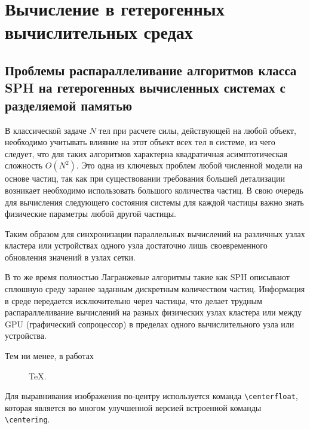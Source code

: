 \chapter{Вычисление в гетерогенных вычислительных средах}\label{ch:ch2}

\section{Проблемы распараллеливание алгоритмов класса SPH на гетерогенных вычисленных системах с разделяемой памятью}\label{sec:ch2/sec1}

В классической задаче \(N\) тел при расчете силы, действующей на любой объект, необходимо учитывать влияние на этот объект всех тел в системе, из чего следует, что для таких алгоритмов характерна квадратичная асимптотическая сложность \(O(N^2)\). Это одна из ключевых проблем любой численной модели на основе частиц, так как при существовании требования большей детализации возникает необходимо использовать большого количества частиц. В свою очередь для вычисления следующего состояния системы для каждой частицы важно знать физические параметры любой другой частицы. 

 Таким образом для синхронизации параллельных вычислений на различных узлах кластера или устройствах одного узла достаточно лишь своевременного обновления значений в узлах сетки.

В то же время полностью Лагранжевые алгоритмы такие как SPH описывают сплошную среду заранее заданным дискретным количеством частиц. Информация в среде передается исключительно через частицы, что делает трудным распараллеливание вычислений на разных физических узлах кластера или между GPU (графический сопроцессор) в пределах одного вычислительного узла или устройства.

Тем ни менее, в работах \cite {Dominguez2013, Verma2017, Verma2018}
 
\begin{figure}[ht]
  \caption{TeX.}\label{fig:latex}
\end{figure}

Для выравнивания изображения по-центру используется команда \verb+\centerfloat+, которая является во
многом улучшенной версией встроенной команды \verb+\centering+.

